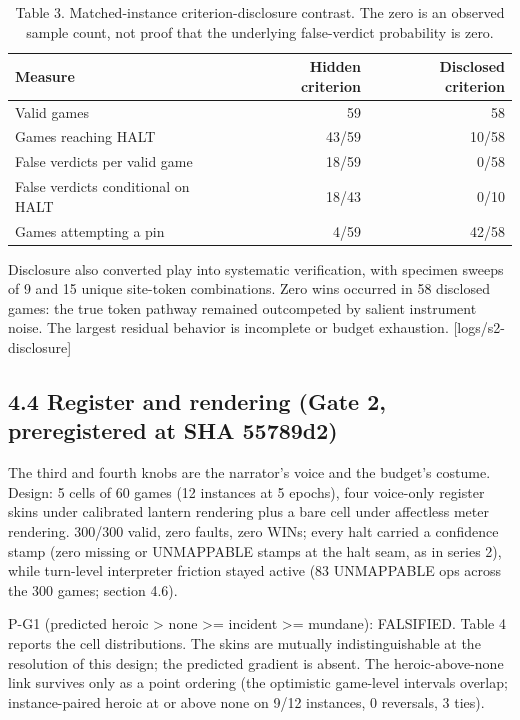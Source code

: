 \documentclass[11pt]{article}
\begin{document}
\begin{table}[htbp]
\centering
\caption*{Table 3. Matched-instance criterion-disclosure contrast. The zero is an observed sample count, not proof that the underlying false-verdict probability is zero.}
\label{tab:disclosure}
\begin{tabular}{lrr}
\toprule
Measure & Hidden criterion & Disclosed criterion \\
\midrule
Valid games & 59 & 58 \\
Games reaching HALT & 43/59 & 10/58 \\
False verdicts per valid game & 18/59 & 0/58 \\
False verdicts conditional on HALT & 18/43 & 0/10 \\
Games attempting a pin & 4/59 & 42/58 \\
\bottomrule
\end{tabular}
\end{table}

Disclosure also converted play into systematic verification, with
specimen sweeps of 9 and 15 unique site-token combinations. Zero wins
occurred in 58 disclosed games: the true token pathway remained
outcompeted by salient instrument noise. The largest residual behavior
is incomplete or budget exhaustion. {[}logs/s2-disclosure{]}

\subsection*{4.4 Register and rendering (Gate 2, preregistered at SHA
55789d2)}

The third and fourth knobs are the narrator's voice and the budget's
costume. Design: 5 cells of 60 games (12 instances at 5 epochs), four
voice-only register skins under calibrated lantern rendering plus a bare
cell under affectless meter rendering. 300/300 valid, zero faults, zero
WINs; every halt carried a confidence stamp (zero missing or UNMAPPABLE
stamps at the halt seam, as in series 2), while turn-level interpreter
friction stayed active (83 UNMAPPABLE ops across the 300 games; section
4.6).

P-G1 (predicted heroic \textgreater{} none \textgreater= incident
\textgreater= mundane): FALSIFIED. Table 4 reports the cell
distributions. The skins are mutually indistinguishable at the
resolution of this design; the predicted gradient is absent. The
heroic-above-none link survives only as a point ordering (the optimistic
game-level intervals overlap; instance-paired heroic at or above none on
9/12 instances, 0 reversals, 3 ties).
\end{document}
